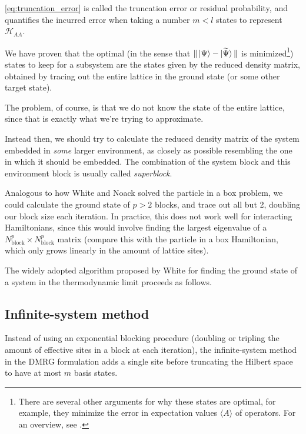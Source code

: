 \autoref{eq:truncation_error} is called the truncation error or residual
probability, and quantifies the incurred error when taking a number $m < l$ states to
represent $\mathcal{H}_{AA}$.

We have proven that the optimal (in the sense that $\Vert \ket{\Psi}
- \ket{\widetilde{\Psi}} \Vert$ is minimized\footnote{There are several other
arguments for why these states are optimal, for example, they minimize the
error in expectation values $\langle A \rangle$ of operators. For an overview,
see \cite{schollwock2005density}.}) states to keep for a subsystem are the
states given by the reduced density matrix, obtained by tracing out the entire
lattice in the ground state (or some other target state).

The problem, of
course, is that we do not know the state of the entire lattice, since that is
exactly what we're trying to approximate.

Instead then, we should try to calculate the reduced density matrix of the
system embedded in \textit{some} larger environment, as closely as possible
resembling the one in which it should be embedded.  The combination of the
system block and this environment block is usually called \textit{superblock}.

Analogous to how White and Noack solved the particle in a box problem, we could
calculate the ground state of $p > 2$ blocks,
and trace out all but 2, doubling our block size each iteration. In
practice, this does not work well for interacting Hamiltonians, since this
would involve finding the largest eigenvalue of a $N_{\text{block}}^p
\times N_{\text{block}}^p$ matrix (compare this with the particle in a box
Hamiltonian, which only grows linearly in the amount of lattice sites).

The widely adopted algorithm proposed by White \cite{white1993density} for
finding the ground state of a system in the thermodynamic limit proceeds
as follows.

\subsection{Infinite-system method}

 
Instead of using an exponential blocking procedure (doubling or tripling the
amount of effective sites in a block at each iteration), the infinite-system
method in the DMRG formulation adds a single site before truncating the Hilbert
space to have at most $m$ basis states.

